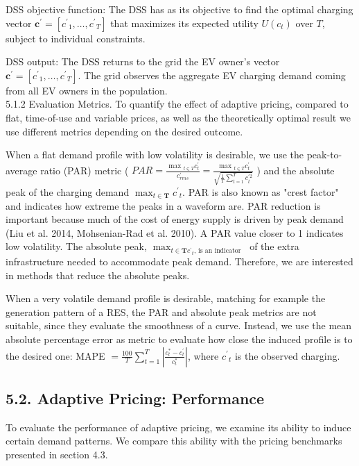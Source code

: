 \documentclass[10pt]{article}
\begin{document}
DSS objective function: The DSS has as its objective to find the optimal charging vector $\mathbf{c}^{\prime}=\left[c^{\prime}{ }_{1}, \ldots, c^{\prime}{ }_{T}\right]$ that maximizes its expected utility $U\left(c_{t}\right)$ over $T$, subject to individual constraints.

DSS output: The DSS returns to the grid the EV owner's vector $\mathbf{c}^{\prime}=\left[c^{\prime}{ }_{1}, \ldots, c^{\prime}{ }_{T}\right]$. The grid observes the aggregate EV charging demand coming from all EV owners in the population.\\
5.1.2 Evaluation Metrics. To quantify the effect of adaptive pricing, compared to flat, time-of-use and variable prices, as well as the theoretically optimal result we use different metrics depending on the desired outcome.

When a flat demand profile with low volatility is desirable, we use the peak-to-average ratio (PAR) metric ( $P A R=\frac{\text { max }_{t \in T} c_{t}^{\prime}}{c_{r m s}^{\prime}}=\frac{\text { max }_{t \in T} c_{t}^{\prime}}{\sqrt{\frac{1}{T} \sum_{t=1}^{T} c_{t}^{\prime 2}}}$ ) and the absolute peak of the charging demand $\max _{t \in \mathbf{T}} c^{\prime}{ }_{t}$. PAR is also known as "crest factor" and indicates how extreme the peaks in a waveform are. PAR reduction is important because much of the cost of energy supply is driven by peak demand (Liu et al. 2014, Mohsenian-Rad et al. 2010). A PAR value closer to 1 indicates low volatility. The absolute peak, $\max _{t \in \mathbf{T} c^{\prime}{ }_{t} \text {, is an indicator }}$ of the extra infrastructure needed to accommodate peak demand. Therefore, we are interested in methods that reduce the absolute peaks.

When a very volatile demand profile is desirable, matching for example the generation pattern of a RES, the PAR and absolute peak metrics are not suitable, since they evaluate the smoothness of a curve. Instead, we use the mean absolute percentage error as metric to evaluate how close the induced profile is to the desired one: MAPE $=\frac{100}{T} \sum_{t=1}^{T}\left|\frac{c_{t}^{*}-c_{t}^{\prime}}{c_{t}^{*}}\right|$, where $c^{\prime}{ }_{t}$ is the observed charging.

\subsection*{5.2. Adaptive Pricing: Performance}
To evaluate the performance of adaptive pricing, we examine its ability to induce certain demand patterns. We compare this ability with the pricing benchmarks presented in section 4.3.
\end{document}

